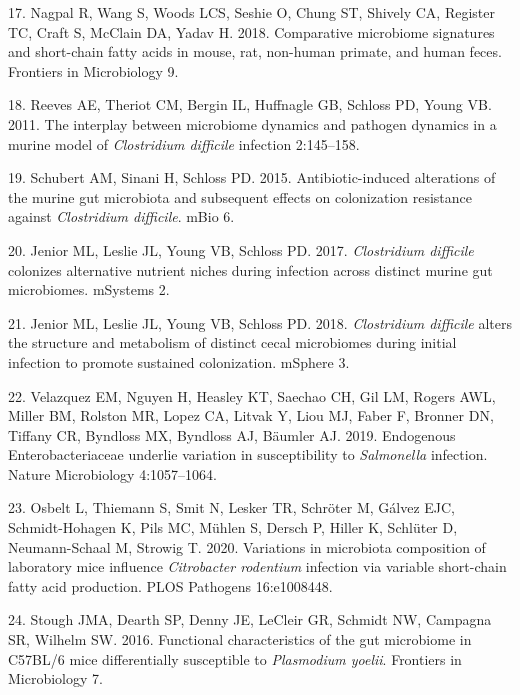 \documentclass[
  11pt,
]{article}
\begin{document}
\leavevmode\hypertarget{ref-Nagpal2018}{}%
17. Nagpal R, Wang S, Woods LCS, Seshie O, Chung ST, Shively CA,
Register TC, Craft S, McClain DA, Yadav H. 2018. Comparative microbiome
signatures and short-chain fatty acids in mouse, rat, non-human primate,
and human feces. Frontiers in Microbiology 9.

\leavevmode\hypertarget{ref-Reeves2011}{}%
18. Reeves AE, Theriot CM, Bergin IL, Huffnagle GB, Schloss PD, Young
VB. 2011. The interplay between microbiome dynamics and pathogen
dynamics in a murine model of \emph{Clostridium difficile} infection
2:145--158.

\leavevmode\hypertarget{ref-Schubert2015}{}%
19. Schubert AM, Sinani H, Schloss PD. 2015. Antibiotic-induced
alterations of the murine gut microbiota and subsequent effects on
colonization resistance against \emph{Clostridium difficile}. mBio 6.

\leavevmode\hypertarget{ref-Jenior2017}{}%
20. Jenior ML, Leslie JL, Young VB, Schloss PD. 2017. \emph{Clostridium
difficile} colonizes alternative nutrient niches during infection across
distinct murine gut microbiomes. mSystems 2.

\leavevmode\hypertarget{ref-Jenior2018}{}%
21. Jenior ML, Leslie JL, Young VB, Schloss PD. 2018. \emph{Clostridium
difficile} alters the structure and metabolism of distinct cecal
microbiomes during initial infection to promote sustained colonization.
mSphere 3.

\leavevmode\hypertarget{ref-Velazquez2019}{}%
22. Velazquez EM, Nguyen H, Heasley KT, Saechao CH, Gil LM, Rogers AWL,
Miller BM, Rolston MR, Lopez CA, Litvak Y, Liou MJ, Faber F, Bronner DN,
Tiffany CR, Byndloss MX, Byndloss AJ, Bäumler AJ. 2019. Endogenous
Enterobacteriaceae underlie variation in susceptibility to
\emph{Salmonella} infection. Nature Microbiology 4:1057--1064.

\leavevmode\hypertarget{ref-Osbelt2020}{}%
23. Osbelt L, Thiemann S, Smit N, Lesker TR, Schröter M, Gálvez EJC,
Schmidt-Hohagen K, Pils MC, Mühlen S, Dersch P, Hiller K, Schlüter D,
Neumann-Schaal M, Strowig T. 2020. Variations in microbiota composition
of laboratory mice influence \emph{Citrobacter rodentium} infection via
variable short-chain fatty acid production. PLOS Pathogens 16:e1008448.

\leavevmode\hypertarget{ref-Stough2016}{}%
24. Stough JMA, Dearth SP, Denny JE, LeCleir GR, Schmidt NW, Campagna
SR, Wilhelm SW. 2016. Functional characteristics of the gut microbiome
in C57BL/6 mice differentially susceptible to \emph{Plasmodium yoelii}.
Frontiers in Microbiology 7.
\end{document}
